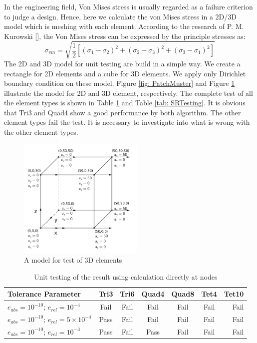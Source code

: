 In the engineering field, Von Mises stress is usually regarded as a failure criterion to judge a design. Hence, here we calculate the von Mises stress in a 2D/3D model which is meshing with each element. According to the research of P. M. Kurowski [\cite{VonMiese}], the Von Mises stress can be expressed by the principle stresses as:
\begin{equation}
\sigma_{vm} = \sqrt{\frac{1}{2}\left[\left(\sigma_1 - \sigma_2\right)^2 + \left(\sigma_2 - \sigma_3\right)^2 + \left(\sigma_3 - \sigma_1\right)^2\right]}
\end{equation}
The 2D and 3D model for unit testing are build in a simple way. We create a rectangle for 2D elements and a cube for 3D elements. We apply only Dirichlet boundary condition on these model. Figure \ref{fig: PatchMuster} and Figure \ref{fig: UnitTest3D} illustrate the model for 2D and 3D element, respectively. 
The complete test of all the element types is shown in Table \ref{tab: DirectTesting} and Table \ref{tab: SRTesting}. It is obvious that Tri3 and Quad4 show a good performance by both algorithm. The other element types fail the test. It is necessary to investigate into what is wrong with the other element types. 

\begin{figure}
	\begin{center}
		\includegraphics[width=6cm,clip]{UnitTest3D.png} 			
		\caption{A model for test of 3D elements} \label{fig: UnitTest3D}
	\end{center}
\end{figure}

\begin{table} 		
	\caption{Unit testing of the result using calculation directly at nodes}
	\label{tab: DirectTesting}
\begin{tabular}{l*{5}{c}r} 

	Tolerance Parameter              & Tri3 & Tri6 & Quad4 & Quad8 & Tet4  & Tet10  \\
	\hline
	$e_{abs}=10^{-10}$; $e_{rel}=10^{-4}$ & Fail & Fail & Fail & Fail & Fail & Fail   \\
	$e_{abs}=10^{-10}$; $e_{rel}=5\times10^{-4}$&  Pass& Fail & Fail & Fail & Fail &  Fail  \\
	$e_{abs}=10^{-10}$; $e_{rel}=10^{-3}$ & Pass & Fail & Pass & Fail &  Fail & Fail   \\
   \hline
\end{tabular}
\end{table}

